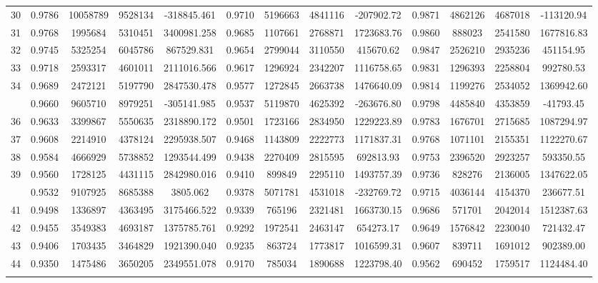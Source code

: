 \documentclass[
  12pt,
]{article}
\begin{document}
\begin{longtable}[t]{lcccccccccccc}
30 & 0.9786 & 10058789 & 9528134 & -318845.461 & 0.9710 & 5196663 & 4841116 & -207902.72 & 0.9871 & 4862126 & 4687018 & -113120.94\\
31 & 0.9768 & 1995684 & 5310451 & 3400981.258 & 0.9685 & 1107661 & 2768871 & 1723683.76 & 0.9860 & 888023 & 2541580 & 1677816.83\\
32 & 0.9745 & 5325254 & 6045786 & 867529.831 & 0.9654 & 2799044 & 3110550 & 415670.62 & 0.9847 & 2526210 & 2935236 & 451154.95\\
33 & 0.9718 & 2593317 & 4601011 & 2111016.566 & 0.9617 & 1296924 & 2342207 & 1116758.65 & 0.9831 & 1296393 & 2258804 & 992780.53\\
34 & 0.9689 & 2472121 & 5197790 & 2847530.478 & 0.9577 & 1272845 & 2663738 & 1476640.09 & 0.9814 & 1199276 & 2534052 & 1369942.60\\
\addlinespace
35 & 0.9660 & 9605710 & 8979251 & -305141.985 & 0.9537 & 5119870 & 4625392 & -263676.80 & 0.9798 & 4485840 & 4353859 & -41793.45\\
36 & 0.9633 & 3399867 & 5550635 & 2318890.172 & 0.9501 & 1723166 & 2834950 & 1229223.89 & 0.9783 & 1676701 & 2715685 & 1087294.97\\
37 & 0.9608 & 2214910 & 4378124 & 2295938.507 & 0.9468 & 1143809 & 2222773 & 1171837.31 & 0.9768 & 1071101 & 2155351 & 1122270.67\\
38 & 0.9584 & 4666929 & 5738852 & 1293544.499 & 0.9438 & 2270409 & 2815595 & 692813.93 & 0.9753 & 2396520 & 2923257 & 593350.55\\
39 & 0.9560 & 1728125 & 4431115 & 2842980.016 & 0.9410 & 899849 & 2295110 & 1493757.39 & 0.9736 & 828276 & 2136005 & 1347622.05\\
\addlinespace
40 & 0.9532 & 9107925 & 8685388 & 3805.062 & 0.9378 & 5071781 & 4531018 & -232769.72 & 0.9715 & 4036144 & 4154370 & 236677.51\\
41 & 0.9498 & 1336897 & 4363495 & 3175466.522 & 0.9339 & 765196 & 2321481 & 1663730.15 & 0.9686 & 571701 & 2042014 & 1512387.63\\
42 & 0.9455 & 3549383 & 4693187 & 1375785.761 & 0.9292 & 1972541 & 2463147 & 654273.17 & 0.9649 & 1576842 & 2230040 & 721432.47\\
43 & 0.9406 & 1703435 & 3464829 & 1921390.040 & 0.9235 & 863724 & 1773817 & 1016599.31 & 0.9607 & 839711 & 1691012 & 902389.00\\
44 & 0.9350 & 1475486 & 3650205 & 2349551.078 & 0.9170 & 785034 & 1890688 & 1223798.40 & 0.9562 & 690452 & 1759517 & 1124484.40\\
\addlinespace

\end{longtable}
\end{document}
